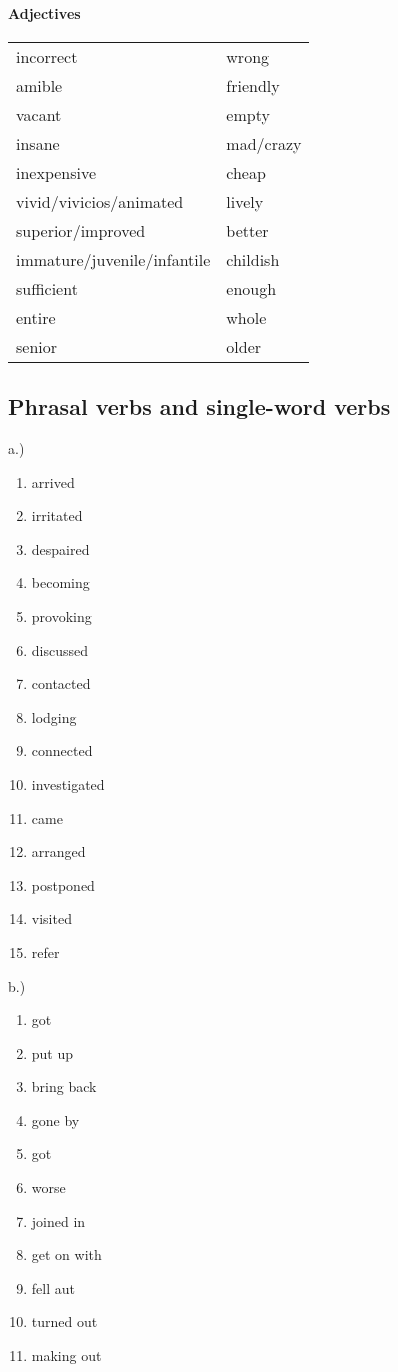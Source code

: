 \documentclass{scrreprt}
\begin{document}
\paragraph{Adjectives}
\begin{tabular}{l l}
incorrect & wrong\\
amible & friendly\\
vacant & empty\\
insane & mad/crazy\\
inexpensive & cheap\\
vivid/vivicios/animated & lively\\
superior/improved & better\\
immature/juvenile/infantile & childish\\
sufficient & enough\\
entire & whole\\
senior & older
\end{tabular}

\subsection{Phrasal verbs and single-word verbs}
a.)
\begin{enumerate}
\item arrived
\item irritated
\item despaired
\item becoming
\item provoking
\item discussed
\item contacted
\item lodging
\item connected
\item investigated
\item came
\item arranged
\item postponed
\item visited
\item refer
\end{enumerate}
b.)
\begin{enumerate}
\item got
\item put up
\item bring back
\item gone by
\item got
\item worse
\item joined in
\item get on with
\item fell aut
\item turned out
\item making out
\end{enumerate}
\end{document}
